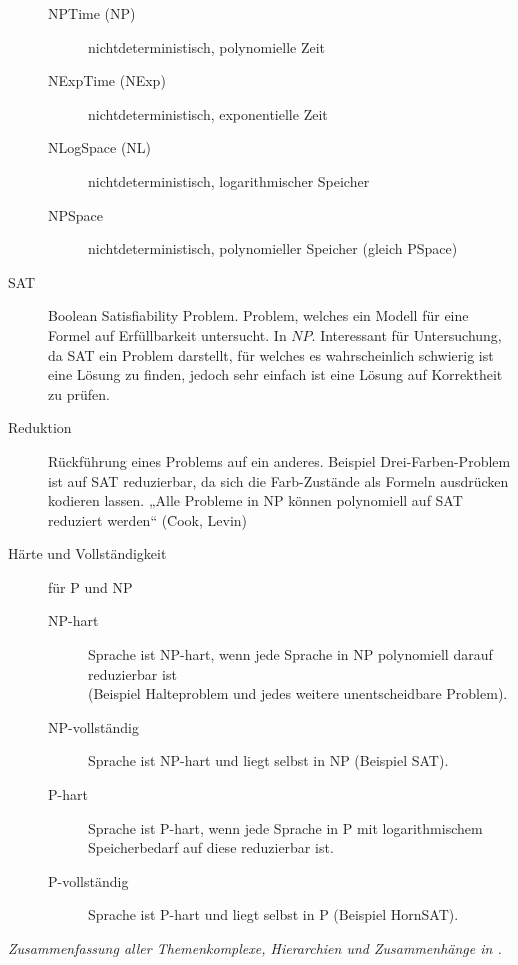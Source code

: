 \begin{description}
\begin{description}
            \item[NPTime (NP)] nichtdeterministisch, polynomielle Zeit
            \item[NExpTime (NExp)] nichtdeterministisch, exponentielle Zeit
            \item[NLogSpace (NL)] nichtdeterministisch, logarithmischer Speicher
            \item[NPSpace] nichtdeterministisch, polynomieller Speicher (gleich PSpace)
        \end{description}

    \item[SAT] Boolean Satisfiability Problem. Problem, welches ein Modell für eine Formel auf Erfüllbarkeit untersucht. In $NP$.
        Interessant für Untersuchung, da SAT ein Problem darstellt, für welches es wahrscheinlich schwierig ist eine Lösung zu finden,
        jedoch sehr einfach ist eine Lösung auf Korrektheit zu prüfen. 

    \item[Reduktion] Rückführung eines Problems auf ein anderes. Beispiel Drei-Farben-Problem ist auf SAT reduzierbar, da sich die Farb-Zustände als
        Formeln ausdrücken kodieren lassen. „Alle Probleme in NP können polynomiell auf SAT reduziert werden“ (\f{Cook, Levin})

    \item[Härte und Vollständigkeit] für P und NP 
        \begin{description}
            \item[NP-hart] Sprache ist NP-hart, wenn jede Sprache in NP polynomiell darauf reduzierbar ist \\
                (Beispiel Halteproblem und jedes weitere unentscheidbare Problem).
            \item[NP-vollständig] Sprache ist NP-hart und liegt selbst in NP (Beispiel SAT).

            \item[P-hart] Sprache ist P-hart, wenn jede Sprache in P mit logarithmischem Speicherbedarf auf diese reduzierbar ist.
            \item[P-vollständig] Sprache ist P-hart und liegt selbst in P (Beispiel HornSAT).
        \end{description}
\end{description}

\textit{Zusammenfassung aller Themenkomplexe, Hierarchien und Zusammenhänge in .}
